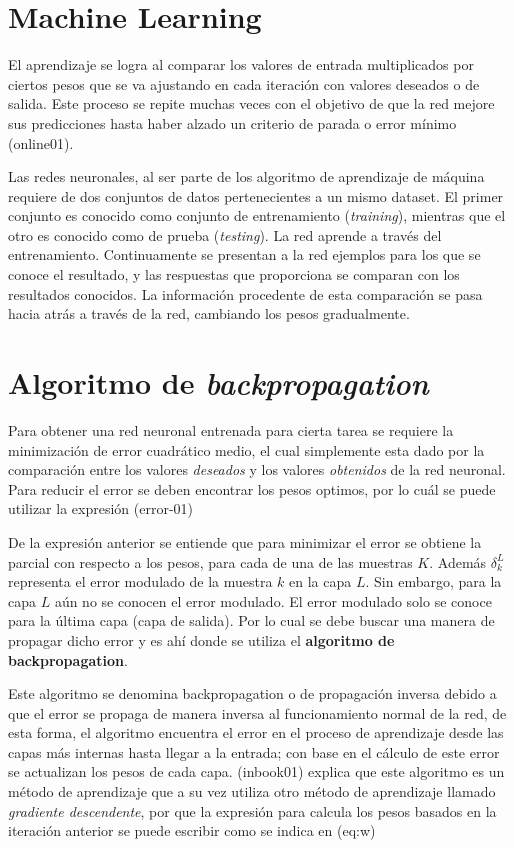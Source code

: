 \documentclass{article}
\begin{document}
  \section{Machine Learning}

  El aprendizaje se logra al comparar los valores de entrada multiplicados por
  ciertos pesos que se va ajustando en cada iteración con valores deseados o de
  salida. Este proceso se repite muchas veces con el objetivo de que la red
  mejore sus predicciones hasta haber alzado un criterio de parada o error
  mínimo (online01).

  Las redes neuronales, al ser parte de los algoritmo de aprendizaje de máquina
  requiere de dos conjuntos de datos pertenecientes a un mismo dataset. El
  primer conjunto es conocido como conjunto de entrenamiento (\textit{training}),
  mientras que el otro es conocido como de prueba (\textit{testing}). La red
  aprende a través del entrenamiento. Continuamente se presentan a la red
  ejemplos para los que se conoce el resultado, y las respuestas que proporciona
  se comparan con los resultados conocidos. La información procedente de esta
  comparación se pasa hacia atrás a través de la red, cambiando los pesos
  gradualmente.

  \section{Algoritmo de \textit{backpropagation}}

  Para obtener una red neuronal entrenada para cierta tarea se requiere la
  minimización de error cuadrático medio, el cual simplemente esta dado por la
  comparación entre los valores \textit{deseados} y los valores
  \textit{obtenidos} de la red neuronal. Para reducir el error se deben
  encontrar los pesos optimos, por lo cuál se puede utilizar la expresión
  (error-01)


  De la expresión anterior se entiende que para minimizar el error se obtiene la
  parcial con respecto a los pesos, para cada de una de las muestras $K$. Además
  $\delta_{k}^{L}$ representa el error modulado de la muestra $k$ en la capa
  $L$.  Sin embargo, para la capa $L$ aún no se conocen el error modulado. El
  error modulado solo se conoce para la última capa (capa de salida). Por lo
  cual se debe buscar una manera de propagar dicho error y es ahí donde se
  utiliza el \textbf{algoritmo de backpropagation}.

  Este algoritmo se denomina backpropagation o de propagación inversa debido a
  que el error se propaga de manera inversa al funcionamiento normal de la red,
  de esta forma, el algoritmo encuentra el error en el proceso de aprendizaje
  desde las capas más internas hasta llegar a la entrada; con base en el cálculo
  de este error se actualizan los pesos de cada capa.
  (inbook01) explica que este algoritmo es un método de aprendizaje que a
  su vez utiliza otro método de aprendizaje llamado \textit{gradiente
  descendente}, por que la expresión para
  calcula los pesos basados en la iteración anterior se puede escribir como se
  indica en (eq:w)
\end{document}
